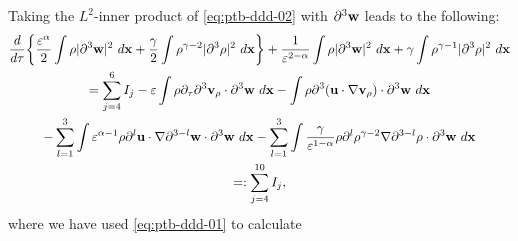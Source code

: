 \documentclass[11pt]{article}
\theoremstyle{plain}
\theoremstyle{definition}
\theoremstyle{remark}
\newcommand{\dtau}{\partial_\tau}
\renewcommand{\vec}[1]{{\bf #1}}
\newcommand{\idx}{\ d\vec x}
\numberwithin{equation}{section}
\begin{document}
Taking the $ L^2 $-inner product of \eqref{eq:ptb-ddd-02} with $ \partial^3 \vec w $ leads to the following:
\begin{equation}
    \label{est:101}
    \begin{gathered}
        \dfrac{d}{d\tau} \biggl\lbrace \frac{\varepsilon^\alpha}{2} \int \rho \vert \partial^3 \vec w \vert^2 \idx + \frac{\gamma}{2} \int \rho^{\gamma-2} \vert \partial^3 \rho \vert^2 \idx  \biggr\rbrace + \frac{1}{\varepsilon^{2-\alpha}} \int \rho \vert \partial^3 \vec w \vert^2 \idx + \gamma \int \rho^{\gamma-1}\vert \partial^3 \rho \vert^2 \idx \\
        = \sum_{j=4}^6 I_j -  \varepsilon \int \rho \dtau \partial^3 \vec v_\rho \cdot \partial^3 \vec w \idx - \int \rho \partial^3(\vec u \cdot \nabla\vec v_\rho ) \cdot \partial^3 \vec w \idx \\
        - \sum_{l=1}^3 \int \varepsilon^{\alpha-1} \rho \partial^l \vec u \cdot \nabla \partial^{3-l} \vec w \cdot \partial^3 \vec w \idx 
        - \sum_{l=1}^3 \int \frac{\gamma}{\varepsilon^{1-\alpha}} \rho \partial^l \rho^{\gamma-2} \nabla \partial^{3-l}\rho \cdot \partial^3 \vec w \idx\\
        =: \sum_{j=4}^{10} I_j,
    \end{gathered}
\end{equation}
where we have used \eqref{eq:ptb-ddd-01} to calculate 
\end{document}
